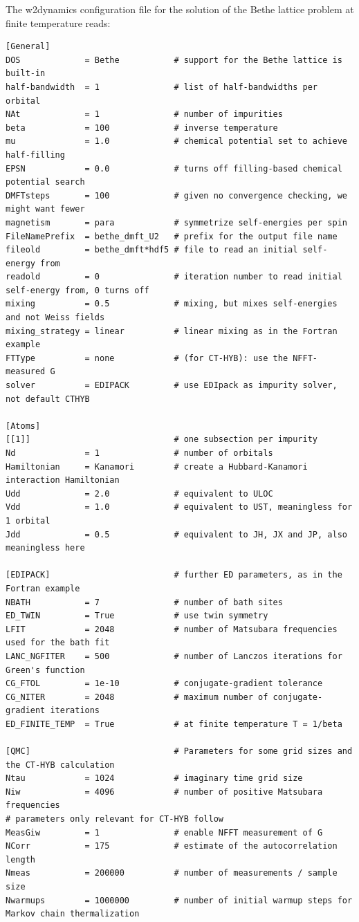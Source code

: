\documentclass[edipack2.tex]{subfiles}
\begin{document}
The w2dynamics configuration file for the solution of the Bethe lattice problem at finite temperature reads: 
\begin{lstlisting}[style=mybash,language={},numbers=none,basicstyle={\scriptsize\ttfamily}]
[General]
DOS             = Bethe           # support for the Bethe lattice is built-in
half-bandwidth  = 1               # list of half-bandwidths per orbital
NAt             = 1               # number of impurities
beta            = 100             # inverse temperature
mu              = 1.0             # chemical potential set to achieve half-filling
EPSN            = 0.0             # turns off filling-based chemical potential search
DMFTsteps       = 100             # given no convergence checking, we might want fewer
magnetism       = para            # symmetrize self-energies per spin
FileNamePrefix  = bethe_dmft_U2   # prefix for the output file name
fileold         = bethe_dmft*hdf5 # file to read an initial self-energy from
readold         = 0               # iteration number to read initial self-energy from, 0 turns off
mixing          = 0.5             # mixing, but mixes self-energies and not Weiss fields
mixing_strategy = linear          # linear mixing as in the Fortran example
FTType          = none            # (for CT-HYB): use the NFFT-measured G
solver          = EDIPACK         # use EDIpack as impurity solver, not default CTHYB

[Atoms]
[[1]]                             # one subsection per impurity
Nd              = 1               # number of orbitals
Hamiltonian     = Kanamori        # create a Hubbard-Kanamori interaction Hamiltonian
Udd             = 2.0             # equivalent to ULOC
Vdd             = 1.0             # equivalent to UST, meaningless for 1 orbital
Jdd             = 0.5             # equivalent to JH, JX and JP, also meaningless here

[EDIPACK]                         # further ED parameters, as in the Fortran example
NBATH           = 7               # number of bath sites
ED_TWIN         = True            # use twin symmetry
LFIT            = 2048            # number of Matsubara frequencies used for the bath fit
LANC_NGFITER    = 500             # number of Lanczos iterations for Green's function
CG_FTOL         = 1e-10           # conjugate-gradient tolerance
CG_NITER        = 2048            # maximum number of conjugate-gradient iterations
ED_FINITE_TEMP  = True            # at finite temperature T = 1/beta

[QMC]                             # Parameters for some grid sizes and the CT-HYB calculation
Ntau            = 1024            # imaginary time grid size
Niw             = 4096            # number of positive Matsubara frequencies
# parameters only relevant for CT-HYB follow
MeasGiw         = 1               # enable NFFT measurement of G
NCorr           = 175             # estimate of the autocorrelation length
Nmeas           = 200000          # number of measurements / sample size
Nwarmups        = 1000000         # number of initial warmup steps for Markov chain thermalization
\end{lstlisting}
\end{document}
